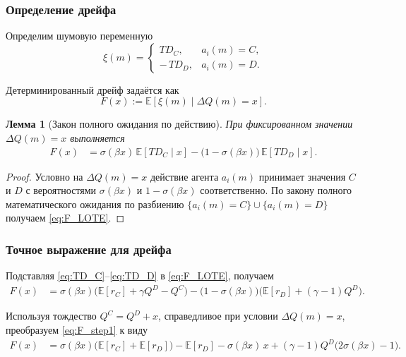 \documentclass[12pt,a4paper]{article}
\newtheorem{lemma}{Лемма}
\theoremstyle{definition}
\begin{document}
\subsubsection{Определение дрейфа}

Определим шумовую переменную
\[
\xi(m)
=
\begin{cases}
TD_C, & a_i(m)=C,\\
-\,TD_D, & a_i(m)=D.
\end{cases}
\]

Детерминированный дрейф задаётся как
\[
F(x)
:=
\mathbb E\!\left[\xi(m)\mid \Delta Q(m)=x\right].
\]

\begin{lemma}[Закон полного ожидания по действию]
\label{lem:LOTE}
При фиксированном значении $\Delta Q(m)=x$ выполняется
\begin{align}
F(x)
&=
\sigma(\beta x)\,
\mathbb E\!\left[TD_C\mid x\right]
-
\bigl(1-\sigma(\beta x)\bigr)\,
\mathbb E\!\left[TD_D\mid x\right].
\label{eq:F_LOTE}
\end{align}
\end{lemma}

\begin{proof}
Условно на $\Delta Q(m)=x$ действие агента $a_i(m)$ принимает значения
$C$ и $D$ с вероятностями $\sigma(\beta x)$ и $1-\sigma(\beta x)$
соответственно.
По закону полного математического ожидания по разбиению
$\{a_i(m)=C\}\cup\{a_i(m)=D\}$ получаем \eqref{eq:F_LOTE}.
\end{proof}

\subsubsection{Точное выражение для дрейфа}

Подставляя \eqref{eq:TD_C}--\eqref{eq:TD_D} в \eqref{eq:F_LOTE}, получаем
\begin{align}
F(x)
&=
\sigma(\beta x)
\bigl(
\mathbb E[r_C]
+
\gamma Q^D
-
Q^C
\bigr)
-
\bigl(1-\sigma(\beta x)\bigr)
\bigl(
\mathbb E[r_D]
+
(\gamma-1)Q^D
\bigr).
\label{eq:F_step1}
\end{align}

Используя тождество $Q^C = Q^D + x$, справедливое при условии
$\Delta Q(m)=x$, преобразуем \eqref{eq:F_step1} к виду
\begin{align}
F(x)
&=
\sigma(\beta x)\bigl(\mathbb E[r_C]+\mathbb E[r_D]\bigr)
-
\mathbb E[r_D]
-
\sigma(\beta x)\,x
+
(\gamma-1)Q^D\bigl(2\sigma(\beta x)-1\bigr).
\label{eq:F_exact}
\end{align}
\end{document}
